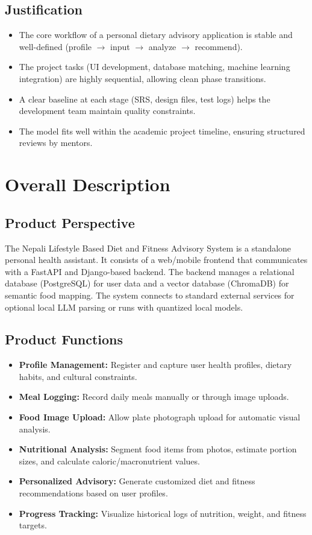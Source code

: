 \documentclass[11pt,a4paper]{article}
\begin{document}
\subsection{Justification}
\begin{itemize}[leftmargin=*]
  \item The core workflow of a personal dietary advisory application is stable and well-defined (profile $\rightarrow$ input $\rightarrow$ analyze $\rightarrow$ recommend).
  \item The project tasks (UI development, database matching, machine learning integration) are highly sequential, allowing clean phase transitions.
  \item A clear baseline at each stage (SRS, design files, test logs) helps the development team maintain quality constraints.
  \item The model fits well within the academic project timeline, ensuring structured reviews by mentors.
\end{itemize}


\section{Overall Description}

\subsection{Product Perspective}
The Nepali Lifestyle Based Diet and Fitness Advisory System is a standalone personal health assistant. It consists of a web/mobile frontend that communicates with a FastAPI and Django-based backend. The backend manages a relational database (PostgreSQL) for user data and a vector database (ChromaDB) for semantic food mapping. The system connects to standard external services for optional local LLM parsing or runs with quantized local models.

\subsection{Product Functions}
\begin{itemize}[leftmargin=*]
  \item \textbf{Profile Management:} Register and capture user health profiles, dietary habits, and cultural constraints.
  \item \textbf{Meal Logging:} Record daily meals manually or through image uploads.
  \item \textbf{Food Image Upload:} Allow plate photograph upload for automatic visual analysis.
  \item \textbf{Nutritional Analysis:} Segment food items from photos, estimate portion sizes, and calculate caloric/macronutrient values.
  \item \textbf{Personalized Advisory:} Generate customized diet and fitness recommendations based on user profiles.
  \item \textbf{Progress Tracking:} Visualize historical logs of nutrition, weight, and fitness targets.
\end{itemize}
\end{document}
